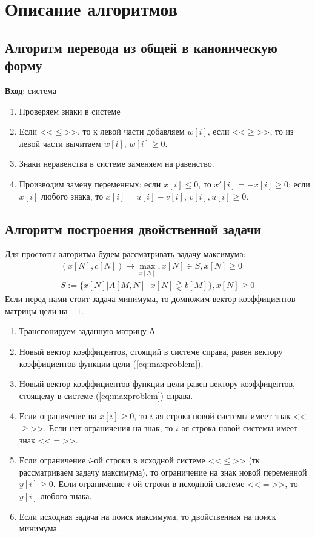 \documentclass[main.tex]{subfiles}
\begin{document}
\newpage
\section{Описание алгоритмов}
\subsection{Алгоритм перевода из общей в каноническую форму}
\textbf{Вход}: система
\begin{enumerate}
\item Проверяем знаки в системе
\item Если <<$\le$>>, то к левой части добавляем $w[i]$, если <<$\ge$>>, то из левой части вычитаем $w[i]$, $w[i]\ge0$.
\item Знаки неравенства в системе заменяем на равенство.
\item Производим замену переменных: если $x[i]\le0$, то $x'[i]=-x[i]\ge0$; если $x[i]$ любого знака, то $x[i]=u[i]-v[i]$, $v[i],u[i] \ge 0$.
\end{enumerate}
\subsection{Алгоритм построения двойственной задачи}
Для простоты алгоритма будем рассматривать задачу максимума:
\begin{equation}\label{eq:maxproblem}
\begin{array}{ll}
(x[N],c[N])\longrightarrow \max_{x[N]}, x[N] \in S, x[N] \ge 0\\
S :=\{x[N]|A[M,N]\cdot x[N] \gtreqless b[M]\}, x[N] \ge 0
\end{array}
\end{equation}
Если перед нами стоит задача минимума, то домножим вектор коэффициентов матрицы цели на $-1$.
\begin{enumerate}
\item Транспонируем заданную матрицу $А$
\item Новый вектор коэффицентов, стоящий в системе справа, равен вектору коэффициентов функции цели (\ref{eq:maxproblem}).
\item Новый вектор коэффициентов функции цели равен вектору коэффицентов, стоящему в системе (\ref{eq:maxproblem}) справа.
\item Если ограничение на $x[i]\ge0$, то $i$-ая строка новой системы имеет знак <<$\ge$>>.
Если нет ограничения на знак, то $i$-ая строка новой системы имеет знак <<$=$>>.
\item Если ограничение $i$-ой строки в исходной системе <<$\le$>> (тк рассматриваем задачу  максимума), то ограничение на знак новой переменной $y[i]\ge0$.
Если ограничение $i$-ой строки в исходной системе <<$=$>>, то $y[i]$ любого знака.
\item Если исходная задача на поиск максимума, то двойственная на поиск минимума.
\end{enumerate}
\end{document}
